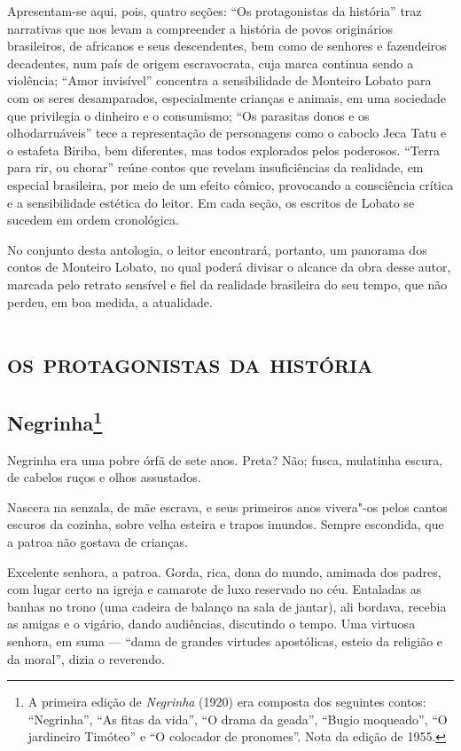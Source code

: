Apresentam-se aqui, pois, quatro seções: ``Os protagonistas da
história'' traz narrativas que nos levam a compreender a história de
povos originários brasileiros, de africanos e seus descendentes, bem
como de senhores e fazendeiros decadentes, num país de origem
escravocrata, cuja marca continua sendo a violência; ``Amor invisível''
concentra a sensibilidade de Monteiro Lobato para com os seres
desamparados, especialmente crianças e animais, em uma sociedade que
privilegia o dinheiro e o consumismo; ``Os parasitas donos e os
olhodarruáveis'' tece a representação de personagens como o caboclo Jeca
Tatu e o estafeta Biriba, bem diferentes, mas todos explorados pelos
poderosos. ``Terra para rir, ou chorar'' reúne contos que revelam
insuficiências da realidade, em especial brasileira, por meio de um
efeito cômico, provocando a consciência crítica e a sensibilidade
estética do leitor. Em cada seção, os escritos de Lobato se sucedem em
ordem cronológica.

No conjunto desta antologia, o leitor encontrará, portanto, um panorama
dos contos de Monteiro Lobato, no qual poderá divisar o alcance da obra
desse autor, marcada pelo retrato sensível e fiel da realidade
brasileira do seu tempo, que não perdeu, em boa medida, a atualidade.


\part{\textsc{os protagonistas da história}}

\chapter{Negrinha\footnote[*]{A primeira edição
  de \emph{Negrinha} (1920) era composta dos seguintes contos:
  ``Negrinha'', ``As fitas da vida'', ``O drama da geada'', ``Bugio
  moqueado'', ``O jardineiro Timóteo'' e ``O colocador de pronomes''.
  Nota da edição de 1955.}}

Negrinha era uma pobre órfã de sete anos. Preta? Não; fusca, mulatinha
escura, de cabelos ruços e olhos assustados.

Nascera na senzala, de mãe escrava, e seus primeiros anos vivera"-os
pelos cantos escuros da cozinha, sobre velha esteira e trapos imundos.
Sempre escondida, que a patroa não gostava de crianças.

Excelente senhora, a patroa. Gorda, rica, dona do mundo, amimada dos
padres, com lugar certo na igreja e camarote de luxo reservado no céu.
Entaladas as banhas no trono (uma cadeira de balanço na sala de jantar),
ali bordava, recebia as amigas e o vigário, dando audiências, discutindo
o tempo. Uma virtuosa senhora, em suma --- ``dama de grandes virtudes
apostólicas, esteio da religião e da moral'', dizia o reverendo.

